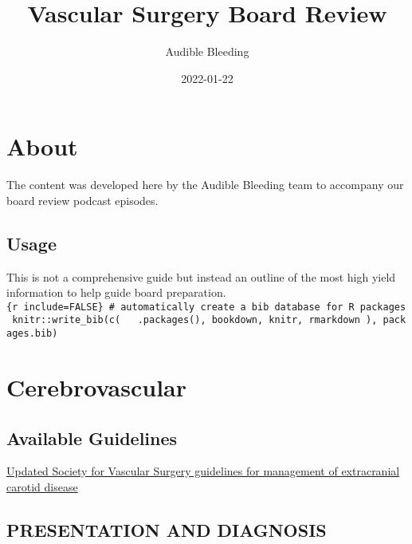 \documentclass[
]{book}
\title{Vascular Surgery Board Review}
\author{Audible Bleeding}
\date{2022-01-22}
\theoremstyle{definition}
\theoremstyle{definition}
\theoremstyle{definition}
\theoremstyle{definition}
\theoremstyle{remark}
\begin{document}
\maketitle

{
\setcounter{tocdepth}{1}
\tableofcontents
}
\hypertarget{about}{%
\chapter{About}\label{about}}

The content was developed here by the Audible Bleeding team to accompany our board review podcast episodes.

\hypertarget{usage}{%
\section{Usage}\label{usage}}

This is not a comprehensive guide but instead an outline of the most high yield information to help guide board preparation.\texttt{\{r\ include=FALSE\}\ \#\ automatically\ create\ a\ bib\ database\ for\ R\ packages\ knitr::write\_bib(c(\ \ \ .packages(),\ \textquotesingle{}bookdown\textquotesingle{},\ \textquotesingle{}knitr\textquotesingle{},\ \textquotesingle{}rmarkdown\textquotesingle{}\ ),\ \textquotesingle{}packages.bib\textquotesingle{})}

\hypertarget{cerebrovascular}{%
\chapter{Cerebrovascular}\label{cerebrovascular}}

\hypertarget{available-guidelines}{%
\section{Available Guidelines}\label{available-guidelines}}

\href{https://www.jvascsurg.org/article/S0741-5214\%2811\%2901635-1/fulltext}{Updated Society for Vascular Surgery guidelines for management of extracranial carotid disease}

\hypertarget{presentation-and-diagnosis}{%
\section{PRESENTATION AND DIAGNOSIS}\label{presentation-and-diagnosis}}
\end{document}

